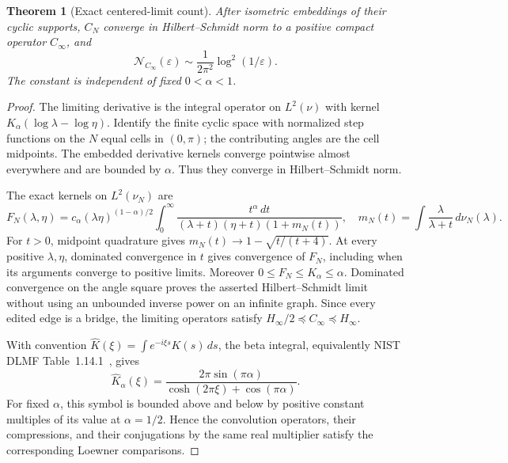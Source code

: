 \documentclass[11pt]{article}
\newtheorem{theorem}{Theorem}[section]
\newcommand{\N}{\mathcal N}
\begin{document}
\begin{theorem}[Exact centered-limit count]\label{thm:center}
After isometric embeddings of their cyclic supports, $C_N$ converge
in Hilbert--Schmidt norm to a positive compact operator $C_\infty$,
and
\[
 \N_{C_\infty}(\varepsilon)
             \sim\frac1{2\pi^2}\log^2(1/\varepsilon).
\]
The constant is independent of fixed $0<\alpha<1$.
\end{theorem}
\begin{proof}
The limiting derivative is the integral operator on $L^2(\nu)$ with
kernel $K_\alpha(\log\lambda-\log\eta)$.
Identify the finite cyclic space with normalized step functions on the
$N$ equal cells in $(0,\pi)$; the contributing angles are the cell
midpoints. The embedded derivative kernels converge pointwise almost
everywhere and are bounded by $\alpha$. Thus they converge in
Hilbert--Schmidt norm.

The exact kernels on $L^2(\nu_N)$ are
\[
 F_N(\lambda,\eta)=c_\alpha(\lambda\eta)^{(1-\alpha)/2}
 \int_0^\infty\frac{t^\alpha\,dt}
 {(\lambda+t)(\eta+t)(1+m_N(t))},\quad
 m_N(t)=\int\frac{\lambda}{\lambda+t}\,d\nu_N(\lambda).
\]
For $t>0$, midpoint quadrature gives
$m_N(t)\to1-\sqrt{t/(t+4)}$.
At every positive $\lambda,\eta$, dominated convergence in $t$
gives convergence of $F_N$, including when its arguments converge to
positive limits. Moreover $0\le F_N\le K_\alpha\le\alpha$.
Dominated convergence on the angle square proves the asserted
Hilbert--Schmidt limit without using an unbounded inverse power on an
infinite graph. Since every edited edge is a bridge, the limiting
operators satisfy $H_\infty/2\preceq C_\infty\preceq H_\infty$.

With convention $\widehat K(\xi)=\int e^{-i\xi s}K(s)\,ds$, the beta
integral, equivalently NIST DLMF Table~1.14.1~\cite{DLMF}, gives
\begin{equation}\label{eq:symbol}
 \widehat K_\alpha(\xi)=
 \frac{2\pi\sin(\pi\alpha)}{\cosh(2\pi\xi)+\cos(\pi\alpha)}.
\end{equation}
For fixed $\alpha$, this symbol is bounded above and below by positive
constant multiples of its value at $\alpha=1/2$.
Hence the convolution operators, their compressions, and their
conjugations by the same real multiplier satisfy the corresponding
Loewner comparisons.


\end{proof}
\end{document}
